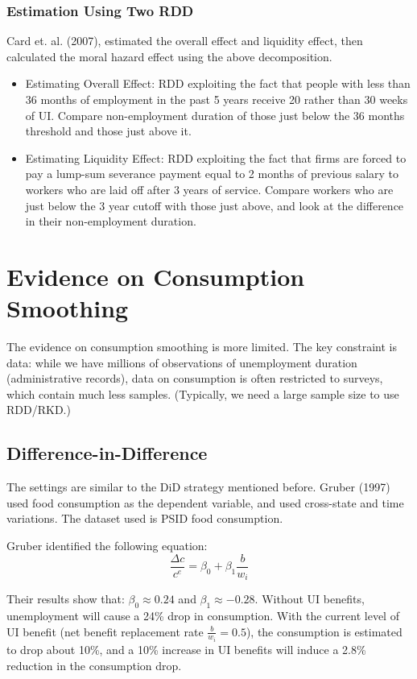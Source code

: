             \subsubsection{Estimation Using Two RDD}
                Card et. al. (2007), estimated the overall effect and liquidity effect, then calculated the moral hazard effect using the above decomposition.
                \begin{itemize}
                    \item Estimating Overall Effect: RDD exploiting the fact that people with less than 36 months of employment in the past 5 years receive 20 rather than 30 weeks of UI. Compare non-employment duration of those just below the 36 months threshold and those just above it.
                    \item Estimating Liquidity Effect: RDD exploiting the fact that firms are forced to pay a lump-sum severance payment equal to 2 months of previous salary to workers who are laid off after 3 years of service. Compare workers who are just below the 3 year cutoff with those just above, and look at the difference in their non-employment duration.
                \end{itemize}
        
\section{Evidence on Consumption Smoothing}
    The evidence on consumption smoothing is more limited. The key constraint is data: while we have millions of observations of unemployment duration (administrative records), data on consumption is often restricted to surveys, which contain much less samples. (Typically, we need a large sample size to use RDD/RKD.)
    
    \subsection{Difference-in-Difference}
        The settings are similar to the DiD strategy mentioned before. Gruber (1997) used food consumption as the dependent variable, and used cross-state and time variations. The dataset used is PSID food consumption.
        
        Gruber identified the following equation:
        $$\frac{\Delta c}{c^e} = \beta_0 + \beta_1 \frac{b}{w_i}$$
        
        Their results show that: $\beta_0 \approx 0.24$ and $\beta_1 \approx -0.28$. Without UI benefits, unemployment will cause a 24\% drop in consumption. With the current level of UI benefit (net benefit replacement rate $\frac{b}{w_i}=0.5$), the consumption is estimated to drop about 10\%, and a 10\% increase in UI benefits will induce a 2.8\% reduction in the consumption drop.
        
